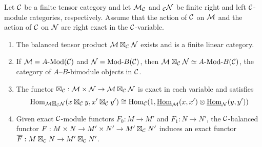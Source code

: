 \documentclass{amsart}
\begin{document}
\begin{theorem} \label{thm:DelignePrdtOverATCExists}
	Let $\mathcal C$ be a finite tensor category and let $\mathcal M_{\mathcal C}$ and ${}_{\mathcal C}\mathcal N$ be finite right and left $\mathcal C$-module categories, respectively. Assume that the action of $\mathcal C$ on $\mathcal M$ and the action of $\mathcal C$ on $\mathcal N$ are right exact in the $\mathcal C$-variable.
	\begin{enumerate}
		\item The balanced tensor product $\mathcal M \boxtimes_{\mathcal C} \mathcal N$ exists and is a finite linear category.
		\item If $\cM = \Mod{A}{}(\cC)$ and $\cN = \Mod{}{B}(\cC)$, then $\cM \boxtimes_{\cC} \cN \simeq \Mod{A }{B}(\cC)$, the category of $A$--$B$-bimodule objects in $\mathcal C$.
		\item The functor $\boxtimes_{\mathcal C}: \mathcal M \times \mathcal N \to \mathcal M \boxtimes_{\mathcal C} \mathcal N$ is exact in each variable and satisfies 
		\begin{equation*}
			 \operatorname{Hom}_{\mathcal M \boxtimes_{\mathcal C} \mathcal N} (x \boxtimes_{\mathcal C} y, x' \boxtimes_{\mathcal C} y') \cong \operatorname{Hom}_{\mathcal C}(1, \operatorname{\underline{Hom}}_{\mathcal M}(x,x') \otimes \operatorname{\underline{Hom}}_{\mathcal N}(y, y'))
		\end{equation*}
		\item Given exact $\mathcal C$-module functors $F_0: M \to M'$ and $F_1: N \to N'$, the $\mathcal C$-balanced functor $F: M \times N \to M' \times N' \to M' \boxtimes_{\mathcal C} N'$ induces an exact functor $\overline{F}: M \boxtimes_{\mathcal C} N \to M' \boxtimes_{\mathcal C} N'$.
	\end{enumerate} 
\end{theorem}
\end{document}
